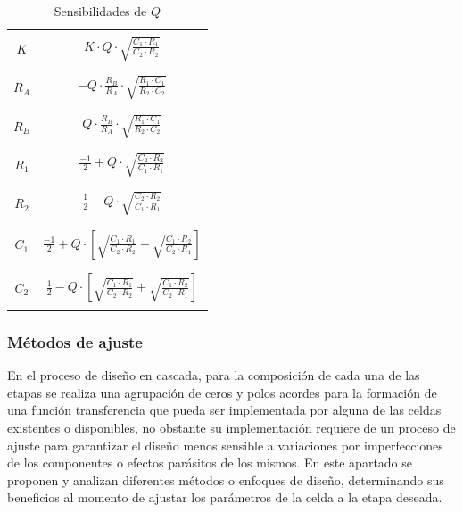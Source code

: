 \begin{table}[H]
    \centering
    \begin{tabular}{c | c}
        \hline \\
        $K$ & $K \cdot Q \cdot \sqrt{\frac{C_1 \cdot R_1}{C_2 \cdot R_2}}$ \\
        \\ \hline \\
        $R_A$ & $-Q \cdot \frac{R_B}{R_A} \cdot \sqrt{\frac{R_1 \cdot C_1}{R_2 \cdot C_2}}$ \\
        \\ \hline \\
        $R_B$ & $Q \cdot \frac{R_B}{R_A} \cdot \sqrt{\frac{R_1 \cdot C_1}{R_2 \cdot C_2}}$ \\
        \\ \hline \\
        $R_1$ & $\frac{-1}{2} + Q \cdot \sqrt{\frac{C_2 \cdot R_2}{C_1 \cdot R_1}}$ \\
        \\ \hline \\
        $R_2$ & $\frac{1}{2} - Q \cdot \sqrt{\frac{C_2 \cdot R_2}{C_1 \cdot R_1}}$ \\
        \\ \hline \\
        $C_1$ & $\frac{-1}{2} + Q \cdot \left[ \sqrt{\frac{C_1 \cdot R_1}{C_2 \cdot R_2}} + \sqrt{\frac{C_1 \cdot R_2}{C_2 \cdot R_1}} \right]$ \\
        \\ \hline \\
        $C_2$ & $\frac{1}{2} - Q \cdot \left[ \sqrt{\frac{C_1 \cdot R_1}{C_2 \cdot R_2}} + \sqrt{\frac{C_1 \cdot R_2}{C_2 \cdot R_1}} \right]$ \\
        \\ \hline
    \end{tabular}
    \caption{Sensibilidades de $Q$}
\end{table}

\subsubsection{M\'etodos de ajuste}
En el proceso de dise\~no en cascada, para la composici\'on de cada una de las etapas se realiza una agrupaci\'on de ceros y polos acordes para la formaci\'on de una 
funci\'on transferencia que pueda ser implementada por alguna de las celdas existentes o disponibles, no obstante su implementaci\'on requiere de un proceso de ajuste para garantizar
el dise\~no menos sensible a variaciones por imperfecciones de los componentes o efectos par\'asitos de los mismos. En este apartado se proponen y analizan diferentes m\'etodos o enfoques de dise\~no, 
determinando sus beneficios al momento de ajustar los par\'ametros de la celda a la etapa deseada.

